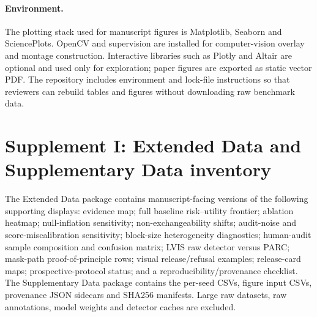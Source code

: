 \documentclass[11pt]{article}
\begin{document}
\paragraph{Environment.}
The plotting stack used for manuscript figures is Matplotlib, Seaborn and SciencePlots.
OpenCV and supervision are installed for computer-vision overlay and montage construction.
Interactive libraries such as Plotly and Altair are optional and used only for exploration; paper figures are exported as static vector PDF.
The repository includes environment and lock-file instructions so that reviewers can rebuild tables and figures without downloading raw benchmark data.

\clearpage

\section*{Supplement I: Extended Data and Supplementary Data inventory}

The Extended Data package contains manuscript-facing versions of the following supporting displays: evidence map; full baseline risk--utility frontier; ablation heatmap; null-inflation sensitivity; non-exchangeability shifts; audit-noise and score-miscalibration sensitivity; block-size heterogeneity diagnostics; human-audit sample composition and confusion matrix; LVIS raw detector versus PARC; mask-path proof-of-principle rows; visual release/refusal examples; release-card maps; prospective-protocol status; and a reproducibility/provenance checklist.
The Supplementary Data package contains the per-seed CSVs, figure input CSVs, provenance JSON sidecars and SHA256 manifests.
Large raw datasets, raw annotations, model weights and detector caches are excluded.
\end{document}
